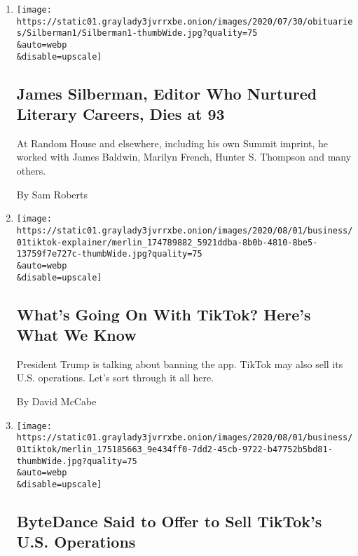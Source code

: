 \begin{enumerate}
\def\labelenumi{\arabic{enumi}.}
\item
  \href{/2020/08/01/books/james-silberman-dead.html}{}

  \texttt{[image: https://static01.graylady3jvrrxbe.onion/images/2020/07/30/obituaries/Silberman1/Silberman1-thumbWide.jpg?quality=75\\\&auto=webp\\\&disable=upscale]}

  \hypertarget{james-silberman-editor-who-nurtured-literary-careers-dies-at-93}{%
  \subsection{James Silberman, Editor Who Nurtured Literary Careers,
  Dies at
  93}\label{james-silberman-editor-who-nurtured-literary-careers-dies-at-93}}

  At Random House and elsewhere, including his own Summit imprint, he
  worked with James Baldwin, Marilyn French, Hunter S. Thompson and many
  others.

  By Sam Roberts
\item
  \href{/2020/08/01/technology/tiktok-trump-microsoft-bytedance-china-ban.html}{}

  \texttt{[image: https://static01.graylady3jvrrxbe.onion/images/2020/08/01/business/01tiktok-explainer/merlin\_174789882\_5921ddba-8b0b-4810-8be5-13759f7e727c-thumbWide.jpg?quality=75\\\&auto=webp\\\&disable=upscale]}

  \hypertarget{whats-going-on-with-tiktok-heres-what-we-know}{%
  \subsection{What's Going On With TikTok? Here's What We
  Know}\label{whats-going-on-with-tiktok-heres-what-we-know}}

  President Trump is talking about banning the app. TikTok may also sell
  its U.S. operations. Let's sort through it all here.

  By David McCabe
\item
  \href{/2020/08/01/technology/tiktok-sale-trump-ban.html}{}

  \texttt{[image: https://static01.graylady3jvrrxbe.onion/images/2020/08/01/business/01tiktok/merlin\_175185663\_9e434ff0-7dd2-45cb-9722-b47752b5bd81-thumbWide.jpg?quality=75\\\&auto=webp\\\&disable=upscale]}

  \hypertarget{bytedance-said-to-offer-to-sell-tiktoks-us-operations}{%
  \subsection{ByteDance Said to Offer to Sell TikTok's U.S.
  Operations}\label{bytedance-said-to-offer-to-sell-tiktoks-us-operations}}


\end{enumerate}
